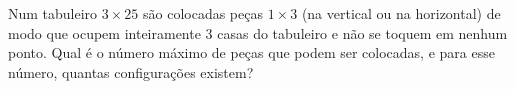 Num tabuleiro $3 \times 25$ são colocadas peças $1 \times 3$ (na vertical ou na horizontal) de modo que ocupem inteiramente $3$ casas do tabuleiro e não se toquem em nenhum ponto.
Qual é o número máximo de peças que podem ser colocadas, e para esse número, quantas configurações existem?
